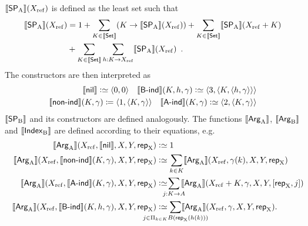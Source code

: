 \documentclass{schwicht}
\begin{document}
$\llbracket \mathsf{SP}_{\mathrm{A}} \rrbracket(X_{\mathrm{ref}})$ is defined as the least set such that
\begin{align*}
\llbracket \mathsf{SP}_{\mathrm{A}} \rrbracket(X_{\mathrm{ref}}) &= 1 + \sum_{K \in \llbracket \mathsf{Set} \rrbracket}(K \to \llbracket \mathsf{SP}_{\mathrm{A}} \rrbracket(X_{\mathrm{ref}}))
  + \sum_{K \in \llbracket \mathsf{Set} \rrbracket}\llbracket \mathsf{SP}_{\mathrm{A}} \rrbracket(X_{\mathrm{ref}} + K) \\
 & {} + \sum_{K \in \llbracket \mathsf{Set} \rrbracket}\sum_{h : K \to X_{\mathrm{ref}}}\llbracket \mathsf{SP}_{\mathrm{A}} \rrbracket(X_{\mathrm{ref}}) \enspace .
\end{align*}
%
The constructors are then interpreted as
%
\begin{align*}
 \llbracket \mathsf{nil} \rrbracket \mathrel{\mathop:}\simeq \langle 0, 0\rangle \quad
 \llbracket \mathsf{B}\text{-}\mathsf{ind} \rrbracket(K, h, \gamma) \mathrel{\mathop:}\simeq \langle 3 , \langle K, \langle h, \gamma \rangle\rangle\rangle
   \\
  \llbracket \mathsf{non}\text{-}\mathsf{ind} \rrbracket(K, \gamma) \coloneqq \langle 1 , \langle K, \gamma
  \rangle\rangle \quad \llbracket \mathsf{A}\text{-}\mathsf{ind} \rrbracket(K, \gamma) \mathrel{\mathop:}\simeq \langle 2 , \langle K, \gamma \rangle\rangle
\end{align*}
$\llbracket \mathsf{SP}_{\mathrm{B}} \rrbracket$ and its constructors are defined analogously. The
functions $\llbracket \mathsf{Arg}_{\mathrm{A}} \rrbracket$, $\llbracket \mathsf{Arg}_{\mathrm{B}} \rrbracket$ and $\llbracket \mathsf{Index}_{\mathrm{B}} \rrbracket$ are defined
according to their equations, e.g.\
\begin{align*}
  \sem{\ArgA}(\Xref, \sem{\nilA}, X, Y, \repA) &\colonsimeq 1 \\
\sem{\ArgA}(\Xref, \sem{\nonindA}(K, \gamma), X, Y, \repA) &\colonsimeq
  \sum_{k \in K} \sem{\ArgA}(\Xref, \gamma(k), X, Y, \repA) \\
\sem{\ArgA}(\Xref, \sem{\AindA}(K, \gamma), X, Y, \repA) &\colonsimeq\!\!\!\!\!
  \sum_{j : K \to A}\!\!\!\sem{\ArgA}(\Xref + K, \gamma, X, Y, [\repA, j])\!\!\!\!\!\!\!\! \\
\sem{\ArgA}(\Xref, \sem{\BindA}(K, h, \gamma), X, Y, \repA) &\colonsimeq
  \sum_{\mathclap{j \in \Pi_{k \in K} B(\repA (h(k)))}}\sem{\ArgA}(\Xref, \gamma, X, Y, \repA).
\end{align*}
\end{document}
